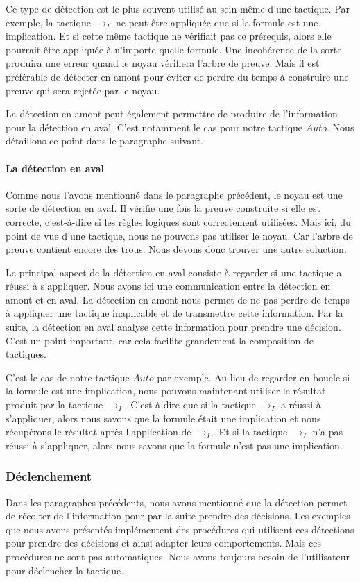 \documentclass[french,titlepage]{article}
\begin{document}
Ce type de détection est le plus souvent utilisé au sein même d'une tactique. Par exemple, la tactique $\to_I$ ne peut être appliquée que si la formule est une implication. Et si cette même tactique ne vérifiait pas ce prérequis, alors elle pourrait être appliquée à n'importe quelle formule. Une incohérence de la sorte produira une erreur quand le noyau vérifiera l'arbre de preuve. Mais il est préférable de détecter en amont pour éviter de perdre du temps à construire une preuve qui sera rejetée par le noyau.

La détection en amont peut également permettre de produire de l'information pour la détection en aval. C'est notamment le cas pour notre tactique $Auto$. Nous détaillons ce point dans le paragraphe suivant.

\paragraph{La détection en aval} \label{realisation:detection_declenchement:detection:aval}
Comme nous l'avons mentionné dans le paragraphe précédent, le noyau est une sorte de détection en aval. Il vérifie une fois la preuve construite si elle est correcte, c'est-à-dire si les règles logiques sont correctement utilisées. Mais ici, du point de vue d'une tactique, nous ne pouvons pas utiliser le noyau. Car l'arbre de preuve contient encore des trous. Nous devons donc trouver une autre soluction.

Le principal aspect de la détection en aval consiste à regarder si une tactique a réussi à s'appliquer. Nous avons ici une communication entre la détection en amont et en aval. La détection en amont nous permet de ne pas perdre de temps à appliquer une tactique inaplicable et de transmettre cette information. Par la suite, la détection en aval analyse cette information pour prendre une décision. C'est un point important, car cela facilite grandement la composition de tactiques.

C'est le cas de notre tactique $Auto$ par exemple. Au lieu de regarder en boucle si la formule est une implication, nous pouvons maintenant utiliser le résultat produit par la tactique $\to_I$. C'est-à-dire que si la tactique $\to_I$ a réussi à s'appliquer, alors nous savons que la formule était une implication et nous récupérons le résultat après l'application de $\to_I$. Et si la tactique $\to_I$ n'a pas réussi à s'appliquer, alors nous savons que la formule n'est pas une implication.

\subsubsection{Déclenchement} \label{realisation:detection_declenchement:declenchement}
Dans les paragraphes précédents, nous avons mentionné que la détection permet de récolter de l'information pour par la suite prendre des décisions. Les exemples que nous avons présentés implémentent des procédures qui utilisent ces détections pour prendre des décisions et ainsi adapter leurs comportements. Mais ces procédures ne sont pas automatiques. Nous avons toujours besoin de l'utilisateur pour déclencher la tactique.
\end{document}
